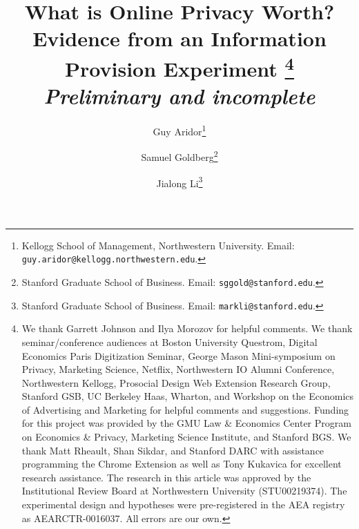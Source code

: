 \documentclass[12pt]{article}
\theoremstyle{definition}
\theoremstyle{remark}
\begin{document}
\title{What is Online Privacy Worth? Evidence from an Information Provision Experiment%
\thanks{We thank Garrett Johnson and Ilya Morozov for helpful comments. We thank seminar/conference audiences at Boston University Questrom, Digital Economics Paris Digitization Seminar, George Mason Mini-symposium on Privacy, Marketing Science, Netflix, Northwestern IO Alumni Conference, Northwestern Kellogg, Prosocial Design Web Extension Research Group, Stanford GSB, UC Berkeley Haas, Wharton, and Workshop on the Economics of Advertising and Marketing for helpful comments and suggestions. Funding for this project was provided by the GMU Law \& Economics Center Program on Economics \& Privacy, Marketing Science Institute, and Stanford BGS. We thank Matt Rheault, Shan Sikdar, and Stanford DARC with assistance programming the Chrome Extension as well as Tony Kukavica for excellent research assistance. The research in this article was approved by the Institutional Review Board at Northwestern University (STU00219374). The experimental design and hypotheses were pre-registered in the AEA registry as AEARCTR-0016037. All errors are our own.} \\
\textit{\normalsize Preliminary and incomplete}
}

\author{
Guy Aridor\thanks{Kellogg School of Management, Northwestern University. 
Email: \texttt{guy.aridor@kellogg.northwestern.edu}.}
\and
Samuel Goldberg\thanks{Stanford Graduate School of Business. 
Email: \texttt{sggold@stanford.edu}.}
\and
Jialong Li\thanks{Stanford Graduate School of Business. 
Email: \texttt{markli@stanford.edu}.}
}

\maketitle
\thispagestyle{empty}
\end{document}
